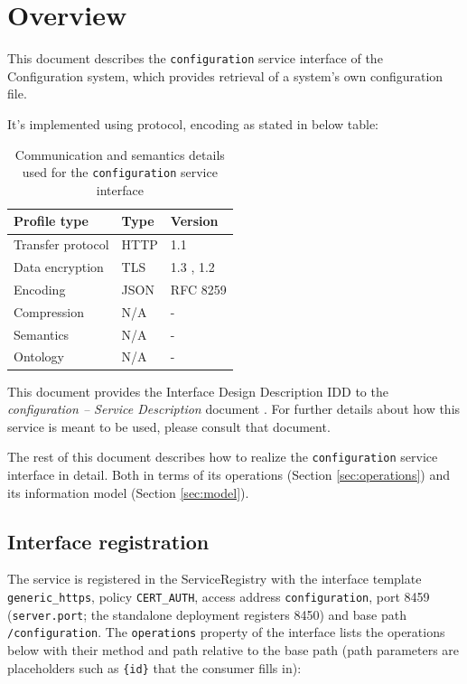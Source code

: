 \documentclass[a4paper]{arrowhead}
\begin{document}
\section{Overview}
\label{sec:overview}

This document describes the \texttt{configuration} service interface of the Configuration system, which provides retrieval of a system's own configuration file.

It's implemented using protocol, encoding as stated in below table:
\begin{table}[ht!]
  \centering
  \begin{tabular}{|l|l|l|}
    \hline
    \rowcolor{gray!33} Profile type & Type & Version \\ \hline
    Transfer protocol & HTTP & 1.1 \cite{rfc9112} \\ \hline
    Data encryption & TLS & 1.3 \cite{rfc8446}, 1.2 \cite{rfc5246} \\ \hline
    Encoding & JSON & RFC 8259 \cite{rfc8259} \\ \hline
    Compression & N/A & - \\ \hline
    Semantics & N/A & - \\ \hline
    Ontology & N/A & - \\ \hline
  \end{tabular}
  \caption{Communication and semantics details used for the \texttt{configuration} service interface}
  \label{tab:comunication_semantics_profile}
\end{table}

This document provides the Interface Design Description IDD to the \textit{configuration -- Service Description} document \cite{cfg-configuration-sd}.
For further details about how this service is meant to be used, please consult that document.

The rest of this document describes how to realize the \texttt{configuration} service
interface in detail. Both in terms of its operations (Section \ref{sec:operations}) and its information model (Section \ref{sec:model}).

\subsection{Interface registration}

The service is registered in the ServiceRegistry with the interface template \texttt{generic\_\allowbreak{}https}, policy \texttt{CERT\_\allowbreak{}AUTH}, access address \texttt{configuration}, port 8459 (\texttt{server.\allowbreak{}port}; the standalone deployment registers 8450) and base path \texttt{/\allowbreak{}configuration}. The \texttt{operations} property of the interface lists the operations below with their method and path relative to the base path (path parameters are placeholders such as \texttt{\{id\}} that the consumer fills in):
\end{document}
